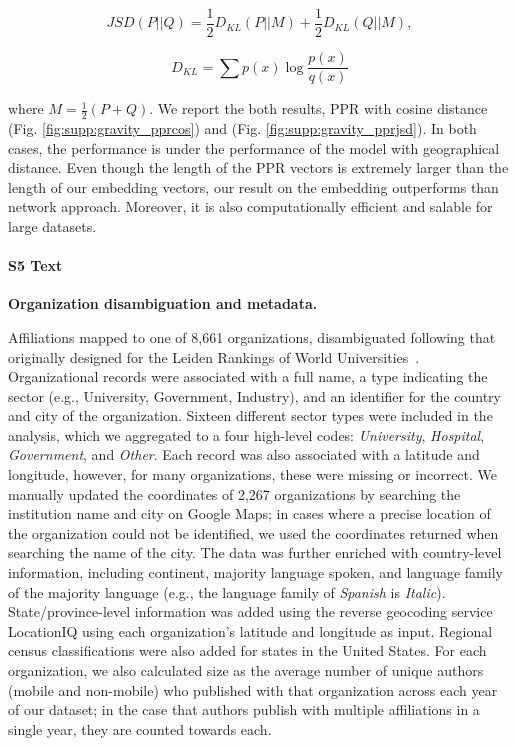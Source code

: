 \documentclass[12pt]{article} %
\begin{document}
\begin{equation}
	\label{eq:JSD}
	JSD(P||Q) = \frac{1}{2}D_{KL}(P||M) + \frac{1}{2}D_{KL}(Q||M),
\end{equation}

\begin{equation}
	\label{eq:KL}
	D_{KL} = \sum p(x)\log\frac{p(x)}{q(x)}
\end{equation}

where $M=\frac{1}{2}(P+Q)$. We report the both results, PPR with cosine distance (Fig. \ref{fig:supp:gravity_pprcos}) and (Fig. \ref{fig:supp:gravity_pprjsd}). In both cases, the performance is under the performance of the model with geographical distance. Even though the length of the PPR vectors is extremely larger than the length of our embedding vectors, our result on the embedding outperforms than network approach. Moreover, it is also computationally efficient and salable for large datasets.



%
\paragraph*{S5 Text}
\label{si:text:organizations}
{\bf Organization disambiguation and metadata.}

Affiliations mapped to one of 8,661 organizations, disambiguated following that originally designed for the Leiden Rankings of World Universities~\autocite{waltman2012leidenrankings}.
Organizational records were associated with a full name, a type indicating the sector (e.g., University, Government, Industry), and an identifier for the country and city of the organization.
Sixteen different sector types were included in the analysis, which we aggregated to a four high-level codes: \textit{University}, \textit{Hospital}, \textit{Government}, and \textit{Other}.
Each record was also associated with a latitude and longitude, however, for many organizations, these were missing or incorrect. We manually updated the coordinates of 2,267 organizations by searching the institution name and city on Google Maps;
in cases where a precise location of the organization could not be identified, we used the coordinates returned when searching the name of the city.
The data was further enriched with country-level information, including continent, majority language spoken, and language family of the majority language (e.g., the language family of \textit{Spanish} is \textit{Italic}).
State/province-level information was added using the reverse geocoding service LocationIQ using each organization's latitude and longitude as input.
Regional census classifications were also added for states in the United States.
For each organization, we also calculated size as the average number of unique authors (mobile and non-mobile) who published with that organization across each year of our dataset;
in the case that authors publish with multiple affiliations in a single year, they are counted towards each.
\end{document}
